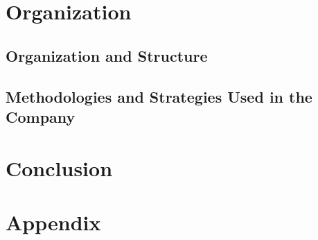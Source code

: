 \documentclass[12pt]{report}
\begin{document}
\chapter{Organization}

    \section{Organization and Structure}

    \section{Methodologies and Strategies Used in the Company}

\chapter{Conclusion}

\chapter{Appendix}
\end{document}
